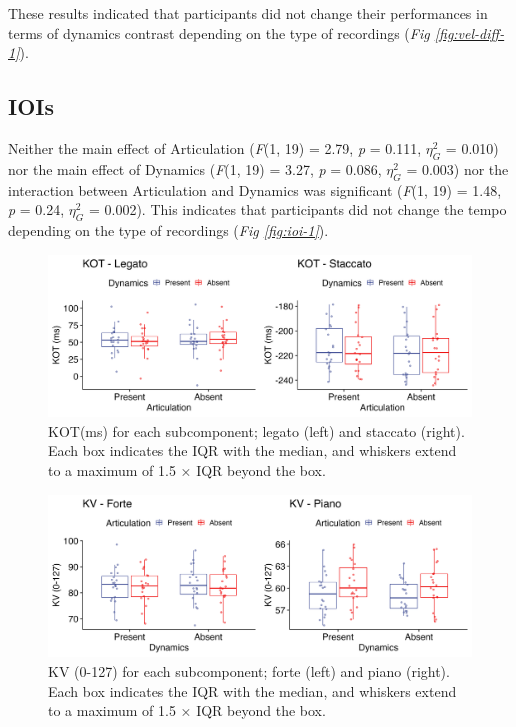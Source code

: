 \documentclass[
  man,floatsintext]{apa6}
\begin{document}
These results indicated that participants did not change their performances in terms of dynamics contrast depending on the type of recordings (\emph{Fig \ref{fig:vel-diff-1}}).

\hypertarget{iois}{%
\subsection{IOIs}\label{iois}}

Neither the main effect of Articulation (\emph{F}(1, 19) = 2.79, \emph{p} = 0.111, \(\eta_G^2\) = 0.010) nor the main effect of Dynamics (\emph{F}(1, 19) = 3.27, \emph{p} = 0.086, \(\eta_G^2\) = 0.003) nor the interaction between Articulation and Dynamics was significant (\emph{F}(1, 19) = 1.48, \emph{p} = 0.24, \(\eta_G^2\) = 0.002). This indicates that participants did not change the tempo depending on the type of recordings (\emph{Fig \ref{fig:ioi-1}}).

\begin{figure}
\includegraphics[width=1\linewidth]{manuscript_files/figure-latex/plot-kot-1-1} \caption{\label{fig:kot-1}KOT(ms) for each subcomponent; legato (left) and staccato (right). Each box indicates the IQR with the median, and whiskers extend to a maximum of 1.5 × IQR beyond the box.}\label{fig:plot-kot-1}
\end{figure}

\begin{figure}
\includegraphics[width=1\linewidth]{manuscript_files/figure-latex/plot-vel-1-1} \caption{\label{fig:vel-1}KV (0-127) for each subcomponent; forte (left) and piano (right). Each box indicates the IQR with the median, and whiskers extend to a maximum of 1.5 × IQR beyond the box.}\label{fig:plot-vel-1}
\end{figure}
\end{document}
